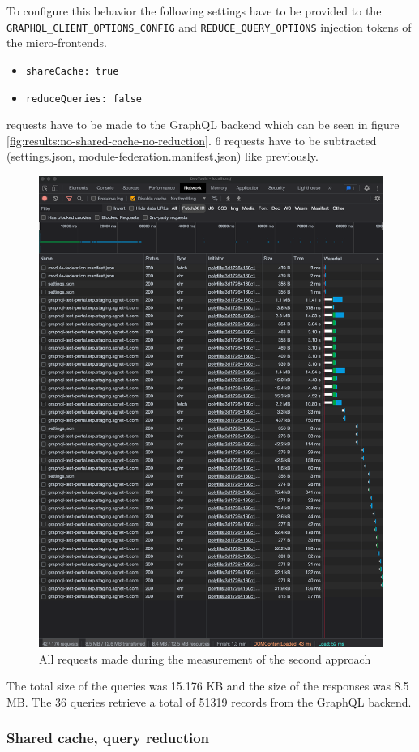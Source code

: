 \noindent To configure this behavior the following settings have to be provided to the \texttt{GRAPHQL\_CLIENT\_OPTIONS\_CONFIG} and \texttt{REDUCE\_QUERY\_OPTIONS} injection tokens of the micro-frontends.

\begin{itemize}
  \item \texttt{shareCache: true}
  \item \texttt{reduceQueries: false}
\end{itemize}

 requests have to be made to the GraphQL backend which can be seen in figure \ref{fig:results:no-shared-cache-no-reduction}. 6 requests have to be subtracted (settings.json, module-federation.manifest.json) like previously.

\ifshowImages
\begin{figure}[H]
\centering
\includegraphics[width=0.6\linewidth]{images/results/1-attempt/shared-not-reduced-cache.png}
\caption{All requests made during the measurement of the second approach}\label{fig:results:shared-cache-no-reduction}
\end{figure}
\fi

\noindent The total size of the queries was 15.176 KB and the size of the responses was 8.5 MB. The 36 queries retrieve a total of 51319 records from the GraphQL backend.

\subsubsection{Shared cache, query reduction}

